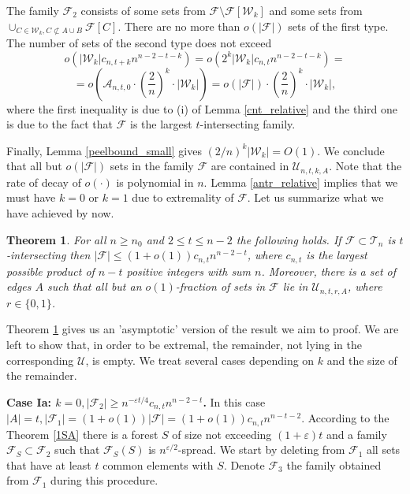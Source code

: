 \documentclass[11pt,letterpaper]{amsart}
\newcommand{\eps}{\varepsilon}
\renewcommand{\le}{\leqslant}
\renewcommand{\ge}{\geqslant}
\newcommand{\ff}{\mathcal{F}}
\newcommand{\aaa}{\mathcal{A}}
\newcommand{\uu}{\mathcal U}
\newcommand{\T}{\mathcal{T}}
\newcommand{\W}{\mathcal{W}}
\newtheorem{theorem}{Theorem}
\begin{document}
The family $\ff_2$ consists of some sets from $\ff \setminus \ff[\W_k]$ and some sets from $\cup_{C\in \W_k, C\not\subset A \cup B} \ff[C]$. There are no more than $o(|\ff|)$ sets of the first type. The number of sets of the second type does not exceed $$o\left(|\W_k|c_{n, t+k}n^{n-2-t-k}\right) = o\left(2^k|\W_k|c_{n, t}n^{n-2-t-k}\right) =$$$$= o\left(\aaa_{n, t, 0}\cdot\left(\frac2n\right)^k\cdot|\W_k|\right) = o(|\ff|) \cdot \left(\frac2n\right)^k\cdot|\W_k|,$$ where the first inequality is due to (i) of Lemma \ref{cnt_relative} and the third one is due to the fact that $\ff$ is the largest $t$-intersecting family.

Finally, Lemma \ref{peelbound_small} gives $(2/n)^k|\W_k| = O(1)$. We  conclude that all but $o(|\ff|)$ sets in the family $\ff$ are contained in $\uu_{n, t, k, A}$. Note that the rate of decay of $o(\cdot)$ is polynomial in  $n$. Lemma \ref{antr_relative} implies that we must have $k = 0$ or $k = 1$ due to extremality of $\ff$. Let us  summarize what we have achieved  by now.

\begin{theorem}\label{bigt_asymp}
    For all $n \ge n_0$ and $2 \le t \le n-2$ the following holds. If $\ff\subset \T_n$ is $t$-intersecting then $|\ff| \le (1 + o(1))c_{n, t}n^{n-2-t}$, where $c_{n, t}$ is the largest possible product of $n-t$ positive integers with sum $n$. Moreover, there is a set of edges $A$ such that all but an $o(1)$-fraction of sets in $\ff$ lie in $\uu_{n, t, r, A}$, where $r \in \{0,1\}$.
\end{theorem}
Theorem \ref{bigt_asymp} gives us an 'asymptotic' version of the result we aim to proof. We are left to show that, in order to be extremal, the remainder, not lying in the corresponding $\uu$, is empty. We treat several cases depending on $k$ and the size of the remainder.

\textbf{Case Ia: $k = 0, |\ff_2| \ge {n^{-\eps t/4}}c_{n, t}n^{n-2-t}$.} In this case $|A| = t, |\ff_1| = (1+o(1))|\ff| = (1+o(1))c_{n, t}n^{n-t-2}$. According to the Theorem \ref{1SA} there is a forest $S$ of size not exceeding $(1+\eps)t$ and a family $\ff_S\subset \ff_2$ such that $\ff_S(S)$ is $n^{\eps/2}$-spread. We start by deleting from $\ff_1$ all sets that have at least $t$ common elements with $S$. Denote $\ff_3$ the family obtained from $\ff_1$ during this procedure.
\end{document}

